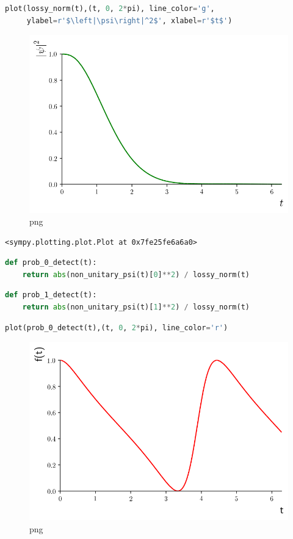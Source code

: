 \begin{lstlisting}[language=Python]
plot(lossy_norm(t),(t, 0, 2*pi), line_color='g',
     ylabel=r'$\left|\psi\right|^2$', xlabel=r'$t$')
\end{lstlisting}

\begin{figure}
\centering
\includegraphics[width=0.6\linewidth]{output_31_0.png}
\caption{png}
\end{figure}

\begin{lstlisting}
<sympy.plotting.plot.Plot at 0x7fe25fe6a6a0>
\end{lstlisting}

\begin{lstlisting}[language=Python]
def prob_0_detect(t):
    return abs(non_unitary_psi(t)[0]**2) / lossy_norm(t)
\end{lstlisting}

\begin{lstlisting}[language=Python]
def prob_1_detect(t):
    return abs(non_unitary_psi(t)[1]**2) / lossy_norm(t)
\end{lstlisting}

\begin{lstlisting}[language=Python]
plot(prob_0_detect(t),(t, 0, 2*pi), line_color='r')
\end{lstlisting}

\begin{figure}
\centering
\includegraphics[width=0.6\linewidth]{output_34_0.png}
\caption{png}
\end{figure}

